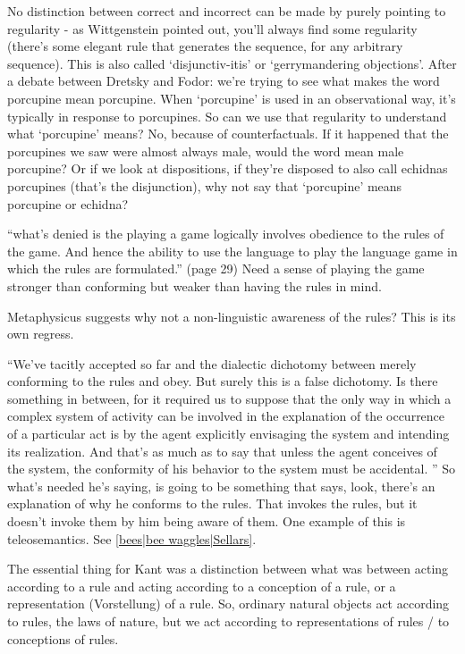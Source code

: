 No distinction between correct and incorrect can be made by purely pointing to regularity - as Wittgenstein pointed out, you'll always find some regularity (there's some elegant rule that generates the sequence, for any arbitrary sequence). This is also called `disjunctiv-itis' or `gerrymandering objections'. After a debate between Dretsky and Fodor: we're trying to see what makes the word porcupine mean porcupine. When `porcupine' is used in an observational way, it's typically in response to porcupines. So can we use that regularity to understand what `porcupine' means? No, because of counterfactuals. If it happened that the porcupines we saw were almost always male, would the word mean male porcupine? Or if we look at dispositions, if they're disposed to also call echidnas porcupines (that's the disjunction), why not say that `porcupine' means porcupine or echidna?

``what's denied is the playing a game logically involves obedience to the rules of the game. And hence the ability to use the language to play the language game in which the rules are formulated.'' (page 29) Need a sense of playing the game stronger than conforming but weaker than having the rules in mind.

Metaphysicus suggests why not a non-linguistic awareness of the rules? This is its own regress.

``We've tacitly accepted so far and the dialectic dichotomy between merely conforming to the rules and obey. But surely this is a false dichotomy. Is there something in between, for it required us to suppose that the only way in which a complex system of activity can be involved in the explanation of the occurrence of a particular act is by the agent explicitly envisaging the system and intending its realization. And that's as much as to say that unless the agent conceives of the system, the conformity of his behavior to the system must be accidental. '' So what's needed he's saying, is going to be something that says, look, there's an explanation of why he conforms to the rules. That invokes the rules, but it doesn't invoke them by him being aware of them. One example of this is teleosemantics. See \ref{bees|bee waggles|Sellars}.

The essential thing for Kant was a distinction between what was between acting according to a rule and acting according to a conception of a rule, or a representation (Vorstellung) of a rule. So, ordinary natural objects act according to rules, the laws of nature, but we act according to representations of rules / to conceptions of rules.

